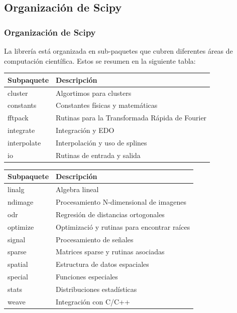 \subsection{Organización de Scipy}
\begin{frame}
\frametitle{Organización de Scipy}
La librería  está organizada en sub-paquetes que cubren diferentes áreas de computación científica. Estos se resumen en la siguiente tabla:
\fontsize{12}{12}\selectfont
\begin{tabular}{l | l}
	Subpaquete	&	Descripción \\ \hline
	cluster		&	Algortimos para clusters \\ \hline
	constants	&	Constantes físicas y matemáticas \\ \hline
	fftpack 	&	Rutinas para la Transformada Rápida de Fourier \\ \hline
	integrate	&	Integración y EDO \\ \hline
	interpolate	&	Interpolación y uso de splines \\ \hline
	io			&	Rutinas de entrada y salida
\end{tabular}
\end{frame}
\begin{frame}
\fontsize{12}{12}\selectfont
\begin{tabular}{l | l}
	Subpaquete	&	Descripción \\ \hline
	linalg		&	Algebra lineal \\ \hline
	ndimage		&	Procesamiento N-dimensional de imagenes \\ \hline
	odr			&	Regresión de distancias ortogonales \\ \hline
	optimize	&	Optimizació y rutinas para encontrar raíces \\ \hline
	signal		&	Procesamiento de señales \\ \hline
	sparse		&	Matrices sparse y rutinas asociadas \\ \hline
	spatial		&	Estructura de datos espaciales \\ \hline
	special		&	Funciones especiales \\ \hline
	stats		&	Distribuciones estadísticas \\ \hline
	weave		&	Integración con C/C++
\end{tabular}
\end{frame}
